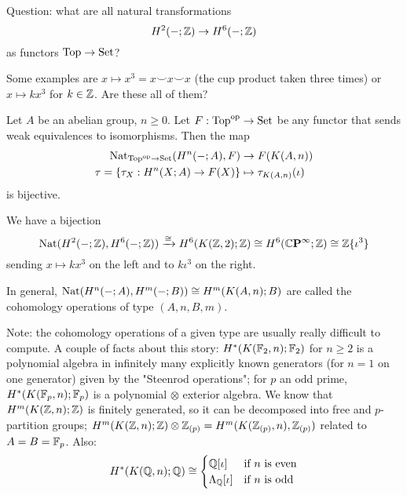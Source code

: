 Question: what are all natural transformations
\[H^2(-;{\mathbb Z})\to H^6(-;{\mathbb Z})\]
as functors ${\mathrm{Top}}\to{\mathrm{Set}}$?

Some examples are $x\mapsto x^3= x\smile x\smile x$ (the cup product taken three times) or $x\mapsto kx^3$ for $k\in{\mathbb Z}$. Are these all of them?

\begin{theorem}\label{theorem:cohomology-operations}
Let $A$ be an abelian group, $n\ge0$. Let $F:{\mathrm{Top}}^{\operatorname{op}}\to{\mathrm{Set}}$ be any functor that sends weak equivalences to isomorphisms. Then the map
\begin{align*}
    \operatorname{Nat}_{{\mathrm{Top}}^{\operatorname{op}}\to{\mathrm{Set}}}(H^n(-;A),F)&\to F(K(A,n))\\
    \tau=\{\tau_X:H^n(X;A)\to F(X)\}&\mapsto \tau_{K(A,n)}(\iota)
\end{align*}
is bijective.
\end{theorem}

\begin{example}
We have a bijection
\[\operatorname{Nat}(H^2(-;{\mathbb Z}),H^6(-;{\mathbb Z}))\xrightarrow{\cong}H^6(K({\mathbb Z},2);{\mathbb Z})\cong H^6({\mathbb{C}\mathbf{P}^{\infty}};{\mathbb Z})\cong{\mathbb Z}\{\iota^3\}\]
sending $x\mapsto kx^3$ on the left and to $k\iota^3$ on the right.
\end{example}

In general, $\operatorname{Nat}(H^n(-;A),H^m(-;B))\cong H^m(K(A,n);B)$ are called the cohomology operations of type $(A,n,B,m)$.

Note: the cohomology operations of a given type are usually really difficult to compute. A couple of facts about this story: $H^*(K(\mathbb{F}_2,n);\mathbb{F}_2)$ for $n\ge2$ is a polynomial algebra in infinitely many explicitly known generators (for $n=1$ on one generator) given by the "Steenrod operations"; for $p$ an odd prime, $H^*(K(\mathbb{F}_p,n);\mathbb{F}_p)$ is a polynomial $\otimes$ exterior algebra. We know that $H^m(K({\mathbb Z},n);{\mathbb Z})$ is finitely generated, so it can be decomposed into free and $p$-partition groups; $H^m(K({\mathbb Z},n);{\mathbb Z})\otimes{\mathbb Z}_{(p)}=H^m(K({\mathbb Z}_{(p)},n),{\mathbb Z}_{(p)})$ related to $A=B=\mathbb{F}_p$. Also:
\[H^*(K({\mathbb Q},n);{\mathbb Q})\cong\begin{cases}
{\mathbb Q}[\iota] &\text{if } n\text{ is even}\\
\Lambda_{\mathbb Q}[\iota] &\text{if } n\text{ is odd}
\end{cases}
\]

